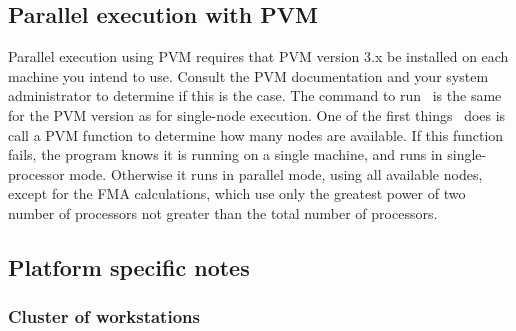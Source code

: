 \subsection{Parallel execution with PVM}

Parallel execution using PVM requires that PVM version 3.x be
installed on each machine you intend to use.  Consult the PVM
documentation and your system administrator to determine if this is
the case.
\prettypar
The command to run \NAMD\ is the same for the PVM version as for
single-node execution.  One of the first things \NAMD\ does is call a
PVM function to determine how many nodes are available.  If this
function fails, the program knows it is running on a single machine,
and runs in single-processor mode.  Otherwise it runs in parallel
mode, using all available nodes, except for the FMA calculations,
which use only the greatest power of two number of processors not
greater than the total number of processors.

%
%
%
%

\subsection{Platform specific notes}

\subsubsection{Cluster of workstations}


